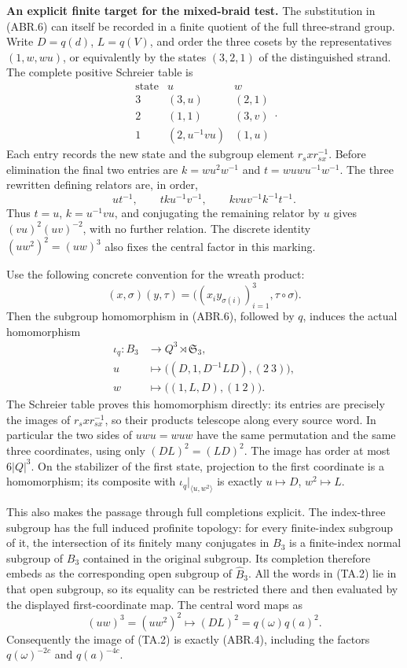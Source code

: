 \par\medskip\noindent\textbf{An explicit finite target for the mixed-braid test.}\quad
The substitution in (ABR.6) can itself be recorded in a finite quotient
of the full three-strand group.  Write
$D=q(d)$, $L=q(V)$, and order the three cosets by the representatives
$(1,w,wu)$, or equivalently by the states $(3,2,1)$ of the distinguished
strand.  The complete positive Schreier table is
\[
\begin{array}{c|cc}
\text{state}&u& w\\\hline
3&(3,u)&(2,1)\\
2&(1,1)&(3,v)\\
1&(2,u^{-1}vu)&(1,u)
\end{array}.
\]
Each entry records the new state and the subgroup element
$r_s x r_{s x}^{-1}$.  Before elimination the final two entries
are $k=w u^2w^{-1}$ and $t=wuwu^{-1}w^{-1}$.
The three rewritten defining relators are, in order,
\[
u t^{-1},\qquad t k u^{-1}v^{-1},\qquad
k v u v^{-1}k^{-1}t^{-1}.
\]
Thus $t=u$, $k=u^{-1}vu$, and conjugating the remaining relator
by $u$ gives $(vu)^2(uv)^{-2}$, with no further relation.
The discrete identity
$(u w^2)^2=(uw)^3$ also fixes the central factor in this marking.

Use the following concrete convention for the wreath product:
\[
 (x,\sigma)(y,\tau)
   =\bigl((x_i y_{\sigma(i)})_{i=1}^3,\tau\circ\sigma\bigr).
\]
Then the subgroup homomorphism in (ABR.6), followed by $q$, induces
the actual homomorphism
\[
\begin{aligned}
 \iota_q:B_3&\longrightarrow Q^3\rtimes\mathfrak S_3,\\
 u&\longmapsto \bigl((D,1,D^{-1}LD),(2\ 3)\bigr),\\
 w&\longmapsto \bigl((1,L,D),(1\ 2)\bigr).
\end{aligned}
\]
The Schreier table proves this homomorphism directly: its entries
are precisely the images of $r_s x r_{s x}^{-1}$, so their products
telescope along every source word.  In particular the two sides
of $uwu=wuw$ have the same permutation and the same three
coordinates, using only $(DL)^2=(LD)^2$.
The image has order at most $6|Q|^3$.  On the stabilizer of the
first state, projection to the first coordinate is a homomorphism;
its composite with $\iota_q|_{\langle u,w^2\rangle}$ is exactly
$u\mapsto D$, $w^2\mapsto L$.

This also makes the passage through full completions explicit.
The index-three subgroup has the full induced profinite topology:
for every finite-index subgroup of it, the intersection of its
finitely many conjugates in $B_3$ is a finite-index normal subgroup
of $B_3$ contained in the original subgroup.  Its completion
therefore embeds as the corresponding open subgroup of
$\widehat B_3$.  All the words in (TA.2) lie in that open subgroup,
so its equality can be restricted there and then evaluated by
the displayed first-coordinate map.  The central word maps as
\[
 (uw)^3=(u w^2)^2\longmapsto
 (DL)^2=q(\omega)q(a)^2.
\]
Consequently the image of (TA.2) is exactly (ABR.4), including
the factors $q(\omega)^{-2c}$ and $q(a)^{-4c}$.

